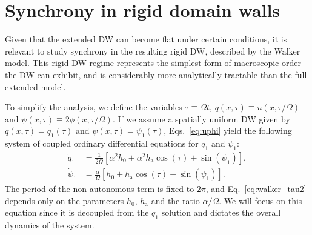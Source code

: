 \documentclass[prb,aps,twocolumn,superscriptaddress,floatfix]{revtex4-2}
\begin{document}
\section{Synchrony in rigid domain walls}
\label{sec:flat_sync}

Given that the extended DW can become flat under certain conditions, it is relevant to study synchrony in the resulting rigid DW, described by the Walker model. This rigid-DW regime represents the simplest form of macroscopic order the DW can exhibit, and is considerably more analytically tractable than the full extended model.

To simplify the analysis, we define the variables $\tau\equiv\Omega t$, $q(x,\tau)\equiv  u(x,\tau/\Omega)$ and $\psi(x,\tau)\equiv2\phi(x,\tau/\Omega)$. If we assume a spatially uniform DW given by $q(x,\tau)=q_1(\tau)$ and $\psi(x,\tau)=\psi_1(\tau)$, Eqs.~\eqref{eq:uphi} yield the following system of coupled ordinary differential equations for $q_1$ and $\psi_1$:
\begin{align}
    \dot{q}_1 &= \frac{1}{2\Omega} \left[ \alpha ^2h_0+\alpha^2h_\text{a}\cos(\tau) + \sin (\psi_1)\right], 
    \label{eq:walker_tau1}
    \\
    \dot \psi_1 &= \frac{\alpha}{\Omega} \left[ h_0 +  h_\text{a}\cos(\tau) - \sin(\psi_1) \right].
    \label{eq:walker_tau2}
\end{align}
The period of the non-autonomous term is fixed to $2\pi$, and Eq.~\eqref{eq:walker_tau2} depends only on the parameters $h_0$, $h_\text{a}$ and the ratio $\alpha/\Omega$. We will focus on this equation since it is decoupled from the $q_1$ solution and dictates the overall dynamics of the system.
\end{document}
